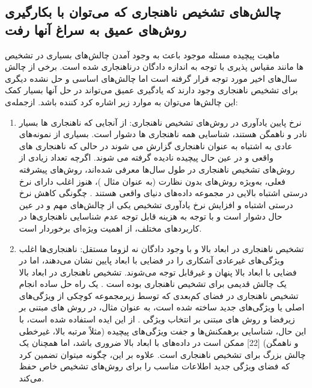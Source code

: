 \documentclass[12pt,a4paper]{report}
\theoremstyle{definition}
\theoremstyle{definition}
\begin{document}
\subsection{چالش‌های تشخیص ناهنجاری که می‌توان با بکارگیری روش‌های عمیق به سراغ آنها رفت }
ماهیت پیچیده مسئله موجود باعث به وجود آمدن چالش‌های بسیاری در تشخیص ناهنجاری شده است. برخی از چالش‌‎ها مانند مقیاس پذیری با توجه به اندازه دادگان در سال‌های اخیر مورد توجه قرار گرفته است اما چالش‌های اساسی و حل نشده دیگری برای تشخیص ناهنجاری وجود دارند که یادگیری عمیق می‌تواند در حل آنها بسیار کمک کننده باشد. ازجمله‌‌‌‌‌‌‌‌‌‌ی ‎این چالش‌ها می‌توان به موارد زیر اشاره کرد:
\begin{enumerate}
\item{
	نرخ پایین یادآوری در روش‌های تشخیص ناهنجاری:
از آنجایی که ناهنجاری ها بسیار نادر و ناهمگن هستند، شناسایی همه ناهنجاری ها دشوار است. بسیاری از نمونه‌های عادی به اشتباه به عنوان ناهنجاری گزارش می شوند در حالی که ناهنجاری های واقعی و در عین حال پیچیده نادیده گرفته می شوند. اگرچه تعداد زیادی از روش‌های تشخیص ناهنجاری در طول سال‌ها معرفی شده‌اند، روش‌های پیشرفته فعلی، به‌ویژه روش‌های بدون نظارت (به عنوان مثال \cite{Breunig2000LOFID})، هنوز اغلب دارای نرخ درستی اشتباه بالایی در مجموعه داده‌های دنیای واقعی هستند \cite{pang2019deep}. چگونگی کاهش نرخ درستی اشتباه و افزایش نرخ یادآوری تشخیص یکی از چالش‌های مهم و در عین حال دشوار است و با توجه به هزینه قابل توجه عدم شناسایی ناهنجاری‌ها در کاربرد‌های مختلف، از اهمیت ویژه‌ای برخوردار است.
}

\item {
تشخیص ناهنجاری در ابعاد بالا و با وجود دادگان نه لزوما مستقل:
ناهنجاری‌ها اغلب ویژگی‌های غیرعادی آشکاری را در فضایی با ابعاد پایین نشان می‌دهند، اما در فضایی با ابعاد بالا پنهان و غیرقابل توجه می‌شوند. تشخیص ناهنجاری در ابعاد بالا یک چالش قدیمی برای تشخیص ناهنجاری بوده است . یک راه حل ساده انجام تشخیص ناهنجاری در فضای کم‌بعدی که توسط زیرمجموعه کوچکی از ویژگی‌های اصلی یا ویژگی‌های جدید ساخته شده است، به عنوان مثال، در روش های مبتنی بر زیرفضا \cite{?, ?, ?, ?} و روش های مبتنی بر انتخاب ویژگی \cite{?,?,?,?}. از این ایده استفاده شده است، با این حال، شناسایی برهمکنش‌ها و جفت‌ ویژگی‌های پیچیده (مثلاً مرتبه بالا، غیرخطی و ناهمگن) [22] ممکن است در داده‌های با ابعاد بالا ضروری باشد، اما همچنان یک چالش بزرگ برای تشخیص ناهنجاری است. علاوه بر این، چگونه میتوان تضمین کرد که فضای ویژگی جدید اطلاعات مناسب را برای روش‌های تشخیص خاص حفظ می‌کند.
}


\end{enumerate}
\end{document}
